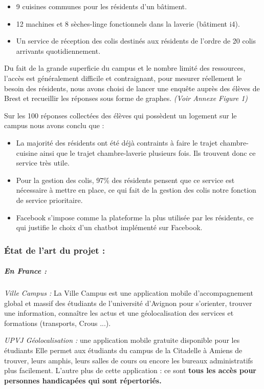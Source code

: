 \documentclass[12pt]{report}
\begin{document}
\begin{itemize}
\item 9 cuisines communes pour les résidents d’un bâtiment.
\item 12 machines et 8 sèches-linge fonctionnels dans la laverie (bâtiment i4).
\item Un service de réception des colis destinés aux résidents de l’ordre de 20 colis arrivants quotidiennement.
\end{itemize}

Du fait de la grande superficie du campus et le nombre limité des ressources, l'accès est généralement difficile et contraignant, pour mesurer réellement le besoin des résidents, nous avons choisi de lancer une enquête auprès des élèves de Brest et recueillir les réponses sous forme de graphes.\textit{ (Voir Annexe Figure 1)}

Sur les 100 réponses collectées des élèves qui possèdent un logement sur le campus nous avons conclu que :
\begin{itemize}
\item La majorité des résidents ont été déjà contraints à faire le trajet chambre-cuisine ainsi que le trajet chambre-laverie plusieurs fois. Ils trouvent donc ce service très utile.
\item Pour la gestion des colis, 97\% des résidents pensent que ce service est nécessaire à mettre en place, ce qui fait de la gestion des colis notre fonction de service prioritaire. 
\item Facebook s’impose comme la plateforme la plus utilisée par les résidents, ce qui justifie le choix d’un chatbot implémenté sur Facebook.
\end{itemize}

\subsubsection{\'{E}tat de l'art du projet :}

\subparagraph{En France : \\}

\textit{Ville Campus :} La Ville Campus est une application mobile d’accompagnement global et massif des étudiants de l'université d’Avignon pour s'orienter, trouver une information, connaître les actus et une géolocalisation des services et formations (transports, Crous ...).

\textit{UPVJ Géolocalisation : }une application mobile gratuite disponible pour les étudiants Elle permet aux étudiants du campus de la Citadelle à Amiens de trouver, leurs amphis, leurs salles de cours ou encore les bureaux administratifs plus facilement. L'autre plus de cette application : ce sont \textbf{tous les accès pour personnes handicapées qui sont répertoriés.}
\end{document}
